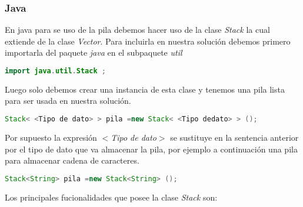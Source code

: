 \subsubsection{Java}
En java para se uso de la pila debemos hacer uso de la clase {\em Stack} la cual extiende de la clase {\em Vector}. Para incluirla en nuestra solución debemos primero importarla del paquete {\em java} en el subpaquete {\em util}

\begin{lstlisting}[language=Java]
import java.util.Stack ;
\end{lstlisting}

Luego solo debemos crear una instancia de esta clase y tenemos una pila lista para ser usada en nuestra solución. 

\begin{lstlisting}[language=Java]
Stack< <Tipo de dato> > pila =new Stack< <Tipo dedato> > ();
\end{lstlisting}

Por supuesto la expresión {\em $<$Tipo de dato$>$ } se sustituye en la sentencia anterior por el tipo de dato que va almacenar la pila, por ejemplo a continuación una pila para almacenar cadena de caracteres.

\begin{lstlisting}[language=Java]
Stack<String> pila =new Stack<String> ();
\end{lstlisting}

Los principales fucionalidades que posee la clase {\em Stack} son:

